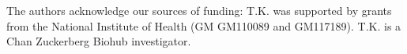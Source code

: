 The authors acknowledge our sources of funding:
T.K. was supported by grants from the National Institute of Health (GM GM110089 and GM117189). T.K. is a Chan Zuckerberg Biohub investigator.